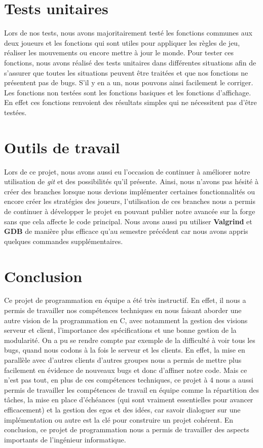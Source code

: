 \documentclass{article}
\begin{document}
\newpage
\section{Tests unitaires}
Lors de nos tests, nous avons majoritairement testé les fonctions communes aux deux joueurs et les fonctions qui sont utiles pour appliquer les règles de jeu, réaliser les mouvements ou encore mettre à jour le monde. Pour tester ces fonctions, nous avons réalisé des tests unitaires dans différentes situations afin de s'assurer que toutes les situations peuvent être traitées et que nos fonctions ne présentent pas de bugs. S'il y en a un, nous pouvons ainsi facilement le corriger. Les fonctions non testées sont les fonctions basiques et les fonctions d'affichage. En effet ces fonctions renvoient des résultats simples qui ne nécessitent pas d'être testées.

\vspace{1cm}
\section{Outils de travail}
Lors de ce projet, nous avons aussi eu l'occasion de continuer à améliorer notre utilisation de \textit{git} et des possibilités qu'il présente. Ainsi, nous n'avons pas hésité à créer des branches lorsque nous devions implémenter certaines fonctionnalités ou encore créer les stratégies des joueurs, l'utilisation de ces branches nous a permis de continuer à développer le projet en pouvant publier notre avancée sur la forge sans que cela affecte le code principal. Nous avons aussi pu utiliser \textbf{Valgrind} et \textbf{GDB} de manière plus efficace qu'au semestre précédent car nous avons appris quelques commandes supplémentaires.

\vspace{1cm}
\section{Conclusion}
Ce projet de programmation en équipe a été très instructif. En effet, il nous a permis de travailler nos compétences techniques en nous faisant aborder une autre vision de la programmation en C, avec notamment la gestion des visions serveur et client, l'importance des spécifications et une bonne gestion de la modularité. On a pu se rendre compte par exemple de la difficulté à voir tous les bugs, quand nous codons à la fois le serveur et les clients. En effet, la mise en parallèle avec d'autres clients d'autres groupes nous a permis de mettre plus facilement en évidence de nouveaux bugs et donc d'affiner notre code. Mais ce n'est pas tout, en plus de ces compétences techniques, ce projet à 4 nous a aussi permis de travailler les compétences de travail en équipe comme la répartition des tâches, la mise en place d'échéances (qui sont vraiment essentielles pour avancer efficacement) et la gestion des egos et des idées, car savoir dialoguer sur une implémentation ou autre est la clé pour construire un projet cohérent. En conclusion, ce projet de programmation nous a permis de travailler des aspects importants de l'ingénieur informatique.
\end{document}
